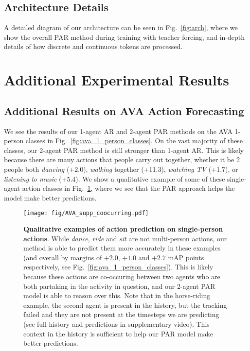 \subsection{Architecture Details}

A detailed diagram of our architecture can be seen in Fig.~\ref{fig:arch}, where we show the overall PAR method during training with teacher forcing, and in-depth details of how discrete and continuous tokens are processed.


\section{Additional Experimental Results}

\subsection{Additional Results on AVA Action Forecasting}

We see the results of our 1-agent AR and 2-agent PAR methods on the AVA 1-person classes in Fig.~\ref{fig:ava_1_person_classes}. On the vast majority of these classes, our 2-agent PAR method is still stronger than 1-agent AR. This is likely because there are many actions that people carry out together, whether it be 2 people both \textit{dancing} (+2.0), \textit{walking} together (+11.3), \textit{watching TV} (+1.7), or \textit{listening to music} (+5.4). We show a qualitative example of some of these single-agent action classes in Fig.~\ref{fig:ava_qual_1_person}, where we see that the PAR approach helps the model make better predictions.

\begin{figure}
    \centering
    \texttt{[image: fig/AVA\_supp\_coocurring.pdf]}
    \caption{\textbf{Qualitative examples of action prediction on single-person actions}. While \textit{dance}, \textit{ride} and \textit{sit} are not multi-person actions, our method is able to predict them more accurately in these examples (and overall by margins of $+2.0$, $+1.0$ and $+2.7$ mAP points respectively, see Fig.~\ref{fig:ava_1_person_classes}). This is likely because these actions are co-occuring between two agents who are both partaking in the activity in question, and our 2-agent PAR model is able to reason over this. Note that in the horse-riding example, the second agent is present in the history, but the tracking failed and they are not present at the timesteps we are predicting (see full history and predictions in supplementary video). This context in the history is sufficient to help  our PAR model make better predictions.}
\label{fig:ava_qual_1_person}
\end{figure}


